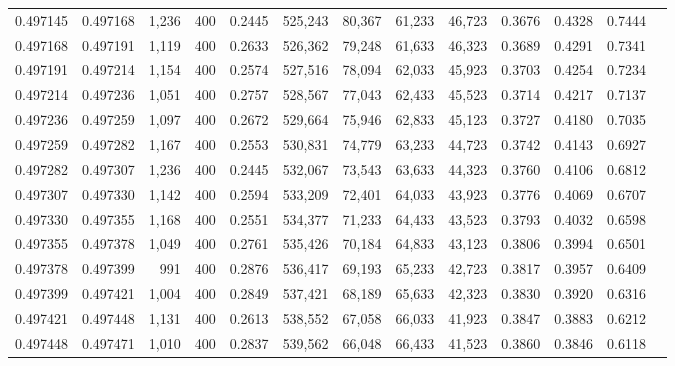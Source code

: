 \begin{tabular}{rrrrrrrrrrrrr}
0.497145 & 0.497168 &  1,236 & 400 &                                     0.2445 & 525,243 &  80,367 &  61,233 &  46,723 & 0.3676 & 0.4328 & 0.7444 \\
0.497168 & 0.497191 &  1,119 & 400 &                                     0.2633 & 526,362 &  79,248 &  61,633 &  46,323 & 0.3689 & 0.4291 & 0.7341 \\
0.497191 & 0.497214 &  1,154 & 400 &                                     0.2574 & 527,516 &  78,094 &  62,033 &  45,923 & 0.3703 & 0.4254 & 0.7234 \\
0.497214 & 0.497236 &  1,051 & 400 &                                     0.2757 & 528,567 &  77,043 &  62,433 &  45,523 & 0.3714 & 0.4217 & 0.7137 \\
0.497236 & 0.497259 &  1,097 & 400 &                                     0.2672 & 529,664 &  75,946 &  62,833 &  45,123 & 0.3727 & 0.4180 & 0.7035 \\
0.497259 & 0.497282 &  1,167 & 400 &                                     0.2553 & 530,831 &  74,779 &  63,233 &  44,723 & 0.3742 & 0.4143 & 0.6927 \\
0.497282 & 0.497307 &  1,236 & 400 &                                     0.2445 & 532,067 &  73,543 &  63,633 &  44,323 & 0.3760 & 0.4106 & 0.6812 \\
0.497307 & 0.497330 &  1,142 & 400 &                                     0.2594 & 533,209 &  72,401 &  64,033 &  43,923 & 0.3776 & 0.4069 & 0.6707 \\
0.497330 & 0.497355 &  1,168 & 400 &                                     0.2551 & 534,377 &  71,233 &  64,433 &  43,523 & 0.3793 & 0.4032 & 0.6598 \\
0.497355 & 0.497378 &  1,049 & 400 &                                     0.2761 & 535,426 &  70,184 &  64,833 &  43,123 & 0.3806 & 0.3994 & 0.6501 \\
0.497378 & 0.497399 &    991 & 400 &                                     0.2876 & 536,417 &  69,193 &  65,233 &  42,723 & 0.3817 & 0.3957 & 0.6409 \\
0.497399 & 0.497421 &  1,004 & 400 &                                     0.2849 & 537,421 &  68,189 &  65,633 &  42,323 & 0.3830 & 0.3920 & 0.6316 \\
0.497421 & 0.497448 &  1,131 & 400 &                                     0.2613 & 538,552 &  67,058 &  66,033 &  41,923 & 0.3847 & 0.3883 & 0.6212 \\
0.497448 & 0.497471 &  1,010 & 400 &                                     0.2837 & 539,562 &  66,048 &  66,433 &  41,523 & 0.3860 & 0.3846 & 0.6118 \\

\end{tabular}
